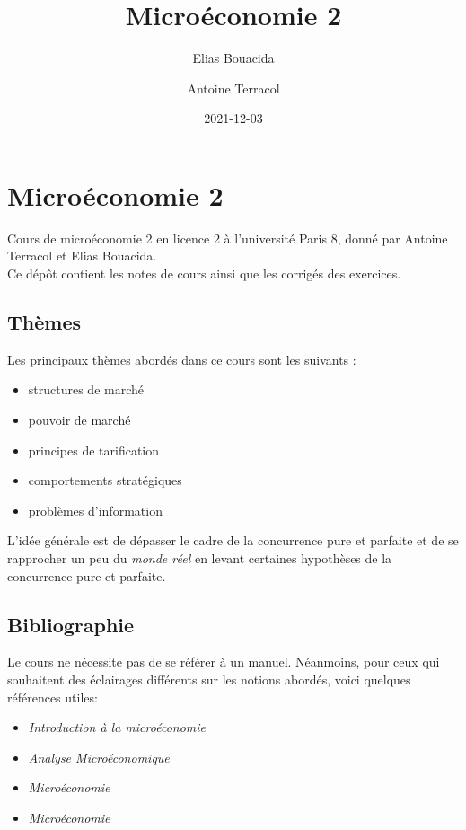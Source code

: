 \documentclass[
]{book}
\title{Microéconomie 2}
\author{Elias Bouacida \and Antoine Terracol}
\date{2021-12-03}
\providecommand{\tightlist}{%
  \setlength{\itemsep}{0pt}\setlength{\parskip}{0pt}}
\theoremstyle{definition}
\theoremstyle{definition}
\theoremstyle{definition}
\theoremstyle{definition}
\theoremstyle{remark}
\begin{document}
\maketitle

{
\setcounter{tocdepth}{1}
\tableofcontents
}
\hypertarget{microuxe9conomie-2}{%
\chapter{Microéconomie 2}\label{microuxe9conomie-2}}

Cours de microéconomie 2 en licence 2 à l'université Paris 8, donné par Antoine Terracol et Elias Bouacida.\\
Ce dépôt contient les notes de cours ainsi que les corrigés des exercices.

\hypertarget{thuxe8mes}{%
\section{Thèmes}\label{thuxe8mes}}

Les principaux thèmes abordés dans ce cours sont les suivants :

\begin{itemize}
\tightlist
\item
  structures de marché
\item
  pouvoir de marché
\item
  principes de tarification
\item
  comportements stratégiques
\item
  problèmes d'information
\end{itemize}

L'idée générale est de dépasser le cadre de la concurrence pure et parfaite et de se rapprocher un peu du \emph{monde réel} en levant certaines hypothèses de la concurrence pure et parfaite.

\hypertarget{bibliographie}{%
\section{Bibliographie}\label{bibliographie}}

Le cours ne nécessite pas de se référer à un manuel.
Néanmoins, pour ceux qui souhaitent des éclairages différents sur les notions abordés, voici quelques références utiles:

\begin{itemize}
\tightlist
\item
  \citet{varian2015} \emph{Introduction à la microéconomie}
\item
  \citet{varian2008} \emph{Analyse Microéconomique}
\item
  \citet{pindyck2012} \emph{Microéconomie}
\item
  \citet{jeleva2014} \emph{Microéconomie}
\end{itemize}
\end{document}
